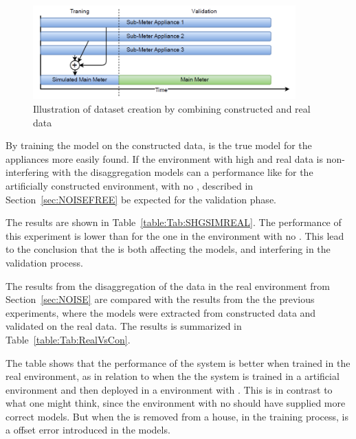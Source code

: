 \begin{figure}[H]
\centering
\includegraphics[width=0.9\textwidth]{billeder/SIMREAL.png}
\caption{Illustration of dataset creation by combining constructed and real data}
\label{fig:SHGSIMREAL}
\end{figure}

By training the model on the constructed data, is the true model for the appliances more easily found. If the environment with high  and real data is non-interfering with the disaggregation models can a performance like for the artificially constructed environment, with no , described in Section~\ref{sec:NOISEFREE} be expected for the validation phase. 




The results are shown in Table~\ref{table:Tab:SHGSIMREAL}. The performance of this experiment is lower than for the one in the environment with no . This lead to the conclusion that the  is both affecting the models, and interfering in the validation process.  

The results from the disaggregation of the data in the real environment from Section~\ref{sec:NOISE} are compared with the results from the the previous experiments, where the models were extracted from constructed data and validated on the real data. The results is summarized in Table~\ref{table:Tab:RealVsCon}. 



The table shows that the performance of the system is better when trained in the real environment, as in relation to when the the system is trained in a artificial environment and then deployed in a environment with . This is in contrast to what one might think, since the environment with no  should have supplied more correct models. But when the  is removed from a house, in the training process, is a offset error introduced in the models. 

